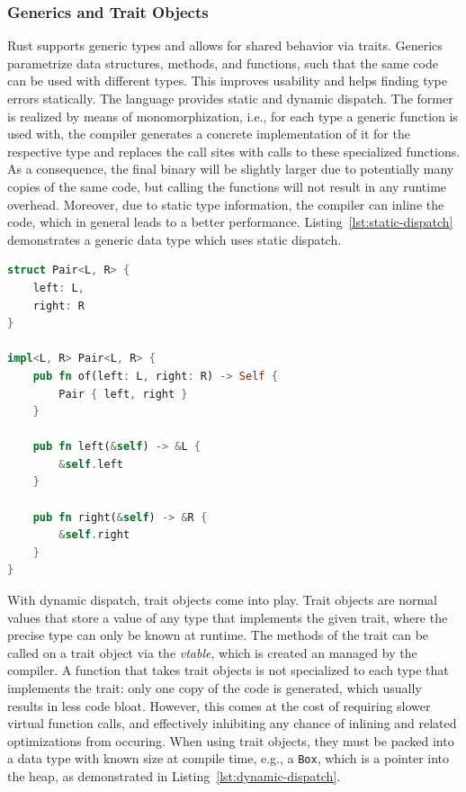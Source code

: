 \documentclass{article}
\begin{document}
\subsubsection{Generics and Trait Objects}
Rust supports generic types and allows for shared behavior via traits. Generics parametrize data structures, methods, and functions, such that the same code can be used with different types. This improves usability and helps finding type errors statically. The language provides static and dynamic dispatch. The former is realized by means of monomorphization, i.e., for each type a generic function is used with, the compiler generates a concrete implementation of it for the respective type and replaces the call sites with calls to these specialized functions. As a consequence, the final binary will be slightly larger due to potentially many copies of the same code, but calling the functions will not result in any runtime overhead. Moreover, due to static type information, the compiler can inline the code, which in general leads to a better performance. Listing~\ref{lst:static-dispatch} demonstrates a generic data type which uses static dispatch.

\begin{lstlisting}[language=Rust, style=boxed, caption=A data type with static dispatch via monomorphization, label=lst:static-dispatch]
struct Pair<L, R> {
    left: L,
    right: R
}

impl<L, R> Pair<L, R> {
    pub fn of(left: L, right: R) -> Self {
        Pair { left, right }
    }

    pub fn left(&self) -> &L {
        &self.left
    }

    pub fn right(&self) -> &R {
        &self.right
    }
}
\end{lstlisting}

With dynamic dispatch, trait objects come into play. Trait objects are normal values that store a value of any type that implements the given trait, where the precise type can only be known at runtime. The methods of the trait can be called on a trait object via the \textit{vtable}, which is created an managed by the compiler. A function that takes trait objects is not specialized to each type that implements the trait: only one copy of the code is generated, which usually results in less code bloat. However, this comes at the cost of requiring slower virtual function calls, and effectively inhibiting any chance of inlining and related optimizations from occuring. When using trait objects, they must be packed into a data type with known size at compile time, e.g., a \lstinline{Box}, which is a pointer into the heap, as demonstrated in Listing~\ref{lst:dynamic-dispatch}.
\end{document}
